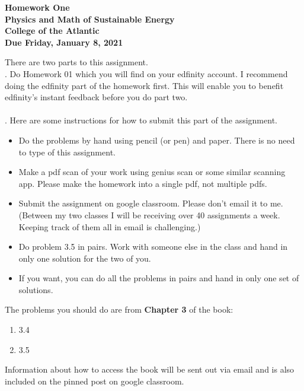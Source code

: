 \documentclass[12pt]{article}
\begin{document}
\pagestyle{empty}
 
\begin{center}
{\LARGE {\bf Homework One}}\\
\bigskip
{\Large {\bf Physics and Math of Sustainable Energy}}\\
\bigskip
{\Large {\bf College of the Atlantic}}\\
\bigskip
{ {\bf Due Friday, January 8, 2021}}\\ 
\end{center}
\medskip


\noindent There are two parts to this assignment.\\

.  Do Homework 01 which you will find
on your edfinity account.  I recommend doing the edfinity part of the
homework first.  This will enable you to benefit edfinity's instant
feedback before you do part two.\\

\hspace{2mm}\\

.  Here are some
instructions for how to submit this part of the assignment.
\begin{itemize}
\item Do the problems by hand using pencil (or pen) and paper.
  There is no need to type of this assignment.
\item Make a pdf scan of your work using genius scan or some
  similar scanning app.  Please make the homework into a single
  pdf, not multiple pdfs.
\item Submit the assignment on google classroom.  Please don't
  email it to me.  (Between my two classes I will be receiving
  over 40 assignments a week.  Keeping track of them all in email
  is challenging.)
\item Do problem 3.5 in pairs. Work with someone else in the class
  and hand in only one solution for the two of you.
\item If you want, you can do all the problems in pairs and hand
  in only one set of solutions.\\
\end{itemize}

\noindent The problems you should do are from {\bf Chapter 3} of the book: 

\begin{enumerate}
\setlength{\itemsep}{-1mm}
  \item 3.4
  \item 3.5\\
\end{enumerate}

\noindent Information about how to access the book will be sent out
via email and is also included on the pinned post on google
classroom. 
\end{document}
